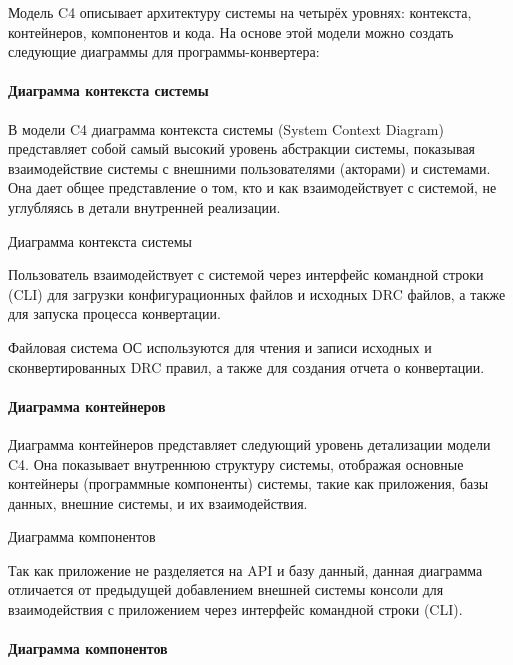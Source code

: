 
Модель C4 описывает архитектуру системы на четырёх уровнях:
контекста, контейнеров, компонентов и кода.
На основе этой модели можно создать следующие диаграммы
для программы-конвертера:

\paragraph{Диаграмма контекста системы}

В модели C4 диаграмма контекста системы (System Context Diagram)
представляет собой самый высокий уровень абстракции системы,
показывая взаимодействие системы с внешними пользователями (акторами)
и системами. Она дает общее представление о том,
кто и как взаимодействует с системой,
не углубляясь в детали внутренней реализации.
   
\begin{image}
	\caption{Диаграмма контекста системы}
	\label{fig:c4:system:context}
\end{image}

Пользователь взаимодействует с системой через интерфейс командной строки (CLI)
для загрузки конфигурационных файлов и исходных DRC файлов,
а также для запуска процесса конвертации.\par
Файловая система ОС используются для чтения и записи исходных
и сконвертированных DRC правил, а также для создания отчета о конвертации.

\paragraph{Диаграмма контейнеров}

Диаграмма контейнеров представляет следующий уровень детализации модели C4.
Она показывает внутреннюю структуру системы,
отображая основные контейнеры (программные компоненты) системы,
такие как приложения, базы данных, внешние системы, и их взаимодействия.
   
\begin{image}
	\caption{Диаграмма компонентов}
	\label{fig:c4:container}
\end{image}

Так как приложение не разделяется на API и базу данный,
данная диаграмма отличается от предыдущей добавлением внешней системы
консоли для взаимодействия с приложением
через интерфейс командной строки (CLI).

\paragraph{Диаграмма компонентов}

